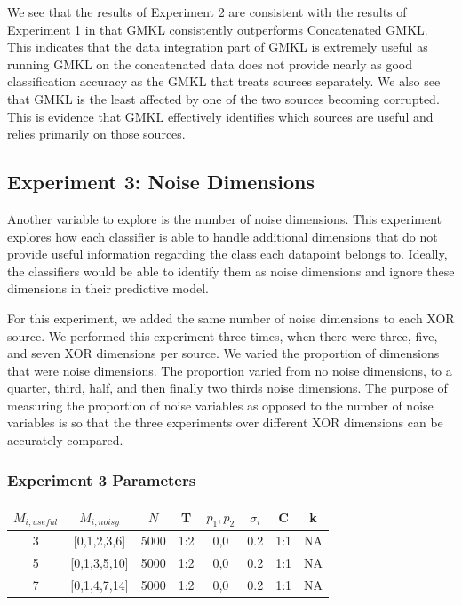 \documentclass{article}
\begin{document}
We see that the results of Experiment 2 are consistent with the results of
Experiment 1 in that GMKL consistently outperforms Concatenated GMKL. This indicates that the data integration part of GMKL is extremely useful as running GMKL on the concatenated data does not provide nearly as good classification accuracy as the GMKL that treats sources separately. We also see that GMKL is the
least affected by one of the two sources becoming corrupted. This is evidence
that GMKL effectively identifies which sources are useful and relies primarily
on those sources.



\subsection*{Experiment 3: Noise Dimensions}

Another variable to explore is the number of noise dimensions. This experiment
explores how each classifier is able to handle additional dimensions that do
not provide useful information regarding the class each datapoint belongs to.
Ideally, the classifiers would be able to identify them as noise dimensions and
ignore these dimensions in their predictive model.

For this experiment, we added the same number of noise dimensions to each XOR
source. We performed this experiment three times, when there were three, five,
and seven XOR dimensions per source. We varied the proportion of dimensions that were
noise dimensions. The proportion varied from no noise dimensions, to a quarter,
third, half, and then finally two thirds noise dimensions. The purpose of
measuring the proportion of noise variables as opposed to the number of noise
variables is so that the three experiments over different XOR dimensions can be
accurately compared.


\subsubsection*{Experiment 3 Parameters}
\begin{center}
\begin{tabular}{|c|c|c|c|c|c|c|c|}
\hline
$M_{i,useful}$ & $M_{i, noisy}$ & $N$ & T &  $p_1, p_2$ & $\sigma_i$ & C &  k  \\
\hline
3& [0,1,2,3,6] & 5000 &1:2 & 0,0 & 0.2 & 1:1 & NA  \\
\hline
5& [0,1,3,5,10] & 5000 &1:2 & 0,0 & 0.2 & 1:1 & NA  \\
\hline
7& [0,1,4,7,14] & 5000 &1:2 & 0,0 & 0.2 & 1:1 & NA  \\
\hline
\end{tabular}
\end{center}
\end{document}
